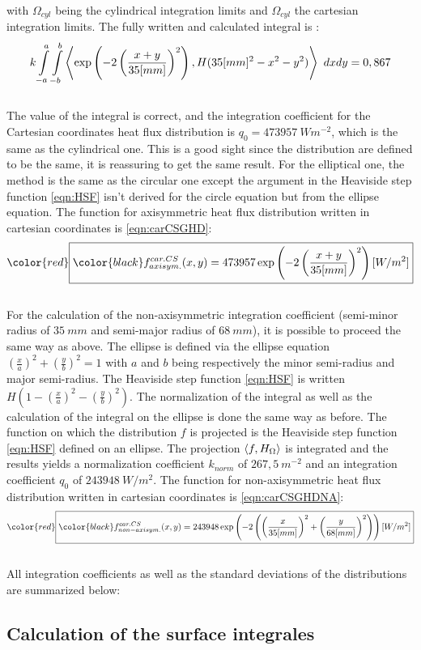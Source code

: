 \\
\normalsize{with $\Omega_{cyl}$ being the cylindrical integration limits and $\Omega_{cyl}$ the cartesian integration limits. The fully written and calculated integral is :}
\\
\begin{equation}
    k \int\displaylimits_{-a}^{a} \int\displaylimits_{-b}^{b} \left\langle \exp\left(-2\left(\frac{x+y}{35[mm]}\right)^2 \right) , H(35[mm]^2 - x^2 - y^2 ) \right\rangle \ dxdy = 0,867
\end{equation}
\\
\normalsize{\indent The value of the integral is correct, and the integration coefficient for the Cartesian coordinates heat flux distribution is $q_0=473957 \ Wm^{-2}$,  which is the same as the cylindrical one. This is a good sight since the distribution are defined to be the same, it is reassuring to get the same result. For the elliptical one, the method is the same as the circular one except the argument in the Heaviside step function \eqref{eqn:HSF} isn’t derived for the circle equation but from the ellipse equation. The function for axisymmetric heat flux distribution written in cartesian coordinates is \eqref{eqn:carCSGHD}:}
\\
\begin{equation}
    \color{red}\boxed{\color{black} f_{axisym.}^{car. CS}(x,y) = 473957 \exp\left(-2\left(\frac{x+y}{35[mm]}\right)^2 \right) [W/m^2]}
    \label{eqn:carCSGHD}
\end{equation}
\\
\normalsize{\indent For the calculation of the non-axisymmetric integration coefficient (semi-minor radius of $35 \ mm$ and semi-major radius of $68 \ mm$), it is possible to proceed the same way as above. The ellipse is defined via the ellipse equation $(\frac{x}{a})^2 + (\frac{y}{b})^2 = 1$ with $a$ and $b$ being respectively the minor semi-radius and major semi-radius. The Heaviside step function \eqref{eqn:HSF} is written $H\left(1 - \left(\frac{x}{a}\right)^2 - \left(\frac{y}{b}\right)^2 \right)$. The normalization of the integral as well as the calculation of the integral on the ellipse is done the same way as before. The function on which the distribution $f$ is projected is the Heaviside step function \eqref{eqn:HSF} defined on an ellipse. The projection $\left\langle f , H_{\Omega} \right\rangle$ is integrated and the results yields a normalization coefficient $k_{norm}$ of $267,5 \ m^{-2}$ and an integration coefficient $q_0$ of $243948 \ W/m^{2}$. The function for non-axisymmetric heat flux distribution written in cartesian coordinates is \eqref{eqn:carCSGHDNA}:}
\\
\begin{equation}
    \color{red}\boxed{\color{black} f_{non-axisym.}^{car. CS}(x,y) = 243948 \exp\left(-2\left(\left(\frac{x}{35[mm]}\right)^2 + \left(\frac{y}{68[mm]}\right)^2 \right) \right) [W/m^2]}
    \label{eqn:carCSGHDNA}
\end{equation}
\\
\normalsize{\indent All integration coefficients as well as the standard deviations of the distributions are summarized below:}


\subsection{Calculation of the surface integrales}